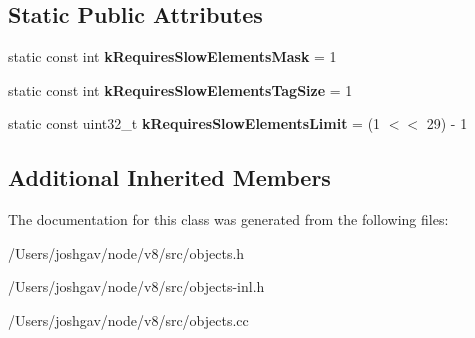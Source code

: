 \subsection*{Static Public Attributes}
\begin{DoxyCompactItemize}
\item 
static const int {\bfseries k\+Requires\+Slow\+Elements\+Mask} = 1\hypertarget{classv8_1_1internal_1_1_seeded_number_dictionary_af07975b7d5f2fa40f44c564f03f7bfa6}{}\label{classv8_1_1internal_1_1_seeded_number_dictionary_af07975b7d5f2fa40f44c564f03f7bfa6}

\item 
static const int {\bfseries k\+Requires\+Slow\+Elements\+Tag\+Size} = 1\hypertarget{classv8_1_1internal_1_1_seeded_number_dictionary_a34f7717701c83f02c689d60d9ac3c402}{}\label{classv8_1_1internal_1_1_seeded_number_dictionary_a34f7717701c83f02c689d60d9ac3c402}

\item 
static const uint32\+\_\+t {\bfseries k\+Requires\+Slow\+Elements\+Limit} = (1 $<$$<$ 29) -\/ 1\hypertarget{classv8_1_1internal_1_1_seeded_number_dictionary_a60c8f3972587f54903789d0e08451809}{}\label{classv8_1_1internal_1_1_seeded_number_dictionary_a60c8f3972587f54903789d0e08451809}

\end{DoxyCompactItemize}
\subsection*{Additional Inherited Members}


The documentation for this class was generated from the following files\+:\begin{DoxyCompactItemize}
\item 
/\+Users/joshgav/node/v8/src/objects.\+h\item 
/\+Users/joshgav/node/v8/src/objects-\/inl.\+h\item 
/\+Users/joshgav/node/v8/src/objects.\+cc\end{DoxyCompactItemize}
